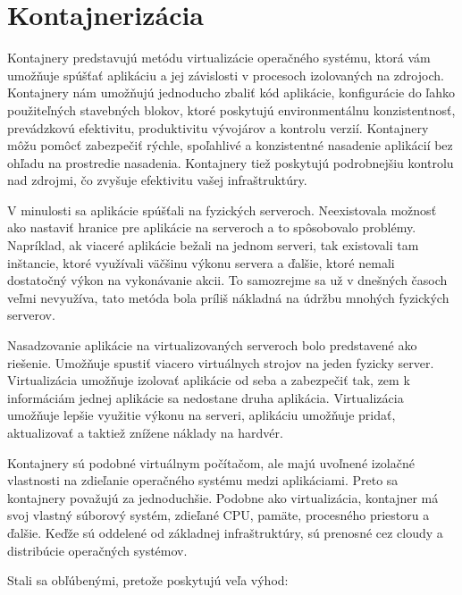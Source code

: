 \clearpage
\section{Kontajnerizácia}

Kontajnery predstavujú metódu virtualizácie operačného systému, ktorá vám umožňuje spúšťať aplikáciu a jej závislosti v procesoch izolovaných na zdrojoch. Kontajnery nám umožňujú jednoducho zbaliť kód aplikácie, konfigurácie do ľahko použiteľných stavebných blokov, ktoré poskytujú environmentálnu konzistentnosť, prevádzkovú efektivitu, produktivitu vývojárov a kontrolu verzií. Kontajnery môžu pomôcť zabezpečiť rýchle, spoľahlivé a konzistentné nasadenie aplikácií bez ohľadu na prostredie nasadenia. Kontajnery tiež poskytujú podrobnejšiu kontrolu nad zdrojmi, čo zvyšuje efektivitu vašej infraštruktúry.

V minulosti sa aplikácie spúšťali na fyzických serveroch. Neexistovala možnosť ako nastaviť hranice pre aplikácie na serveroch a to spôsobovalo problémy. Napríklad, ak viaceré aplikácie bežali na jednom serveri, tak existovali tam inštancie, ktoré využívali väčšinu výkonu servera a ďalšie, ktoré nemali dostatočný výkon na vykonávanie akcii. To samozrejme sa už v dnešných časoch veľmi nevyužíva, tato metóda bola príliš nákladná na údržbu mnohých fyzických serverov.

Nasadzovanie aplikácie na virtualizovaných serveroch bolo predstavené ako riešenie. Umožňuje spustiť viacero virtuálnych strojov na jeden fyzicky server. Virtualizácia umožňuje izolovať aplikácie od seba a zabezpečiť tak, zem k informáciám jednej aplikácie sa nedostane druha aplikácia. Virtualizácia umožňuje lepšie využitie výkonu na serveri, aplikáciu umožňuje pridať, aktualizovať a taktiež znížene náklady na hardvér.

Kontajnery sú podobné virtuálnym počítačom, ale majú uvoľnené izolačné vlastnosti na zdieľanie operačného systému medzi aplikáciami. Preto sa kontajnery považujú za jednoduchšie. Podobne ako virtualizácia, kontajner má svoj vlastný súborový systém, zdieľané CPU, pamäte, procesného priestoru a ďalšie. Keďže sú oddelené od základnej infraštruktúry, sú prenosné cez cloudy a distribúcie operačných systémov.

Stali sa obľúbenými, pretože poskytujú veľa výhod:

